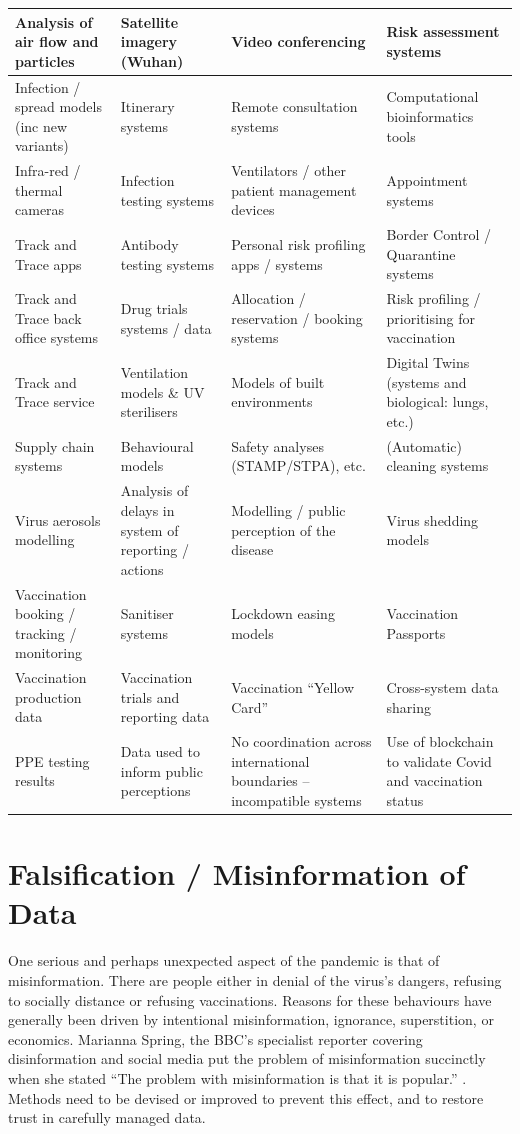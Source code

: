 \begin{longtable}{|L{}|L{}|L{}|L{}|}
  Analysis of air flow and particles & 
  Satellite imagery (Wuhan) &
  Video conferencing &
  Risk assessment systems\\\hline
  Infection / spread models (inc new variants) &
  Itinerary systems &
  Remote consultation systems &
  Computational bioinformatics tools\\\hline
  Infra-red / thermal cameras &
  Infection testing systems &
  Ventilators / other patient management devices &
  Appointment systems\\\hline
  Track and Trace apps &
  Antibody testing systems &
  Personal risk profiling apps / systems &
  Border Control / Quarantine systems\\\hline
  Track and Trace back office systems &
  Drug trials systems / data &
  Allocation / reservation / booking systems &
  Risk profiling / prioritising for vaccination\\\hline
  Track and Trace service &
  Ventilation models \& UV sterilisers &
  Models of built environments &
  Digital Twins (systems and biological: lungs, etc.)\\\hline
  Supply chain systems &
  Behavioural models &
  Safety analyses (STAMP/STPA), etc. &
  (Automatic) cleaning systems\\\hline
  Virus aerosols modelling &
  Analysis of delays in system of reporting / actions &
  Modelling / public perception of the disease &
  Virus shedding models\\\hline
%
  Vaccination booking / tracking / monitoring &
  Sanitiser systems &
  Lockdown easing models &
  Vaccination Passports
  \\\hline
%
  Vaccination production data &
  Vaccination trials and reporting data &
  Vaccination ``Yellow Card'' &
  Cross-system data sharing
  \\\hline
%
  PPE testing results &
  Data used to inform public perceptions &
  No coordination across international boundaries -- incompatible systems &
  Use of blockchain to validate Covid and vaccination status\\
  \hline
\end{longtable}

\section{Falsification / Misinformation of Data}
One serious and perhaps unexpected aspect of the pandemic is that of misinformation. There are people either in denial of the virus’s dangers, refusing to socially distance or refusing vaccinations. Reasons for these behaviours have generally been driven by intentional misinformation, ignorance, superstition, or economics. Marianna Spring, the BBC’s specialist reporter covering disinformation and social media put the problem of misinformation succinctly when she stated “The problem with misinformation is that it is popular.” \cite{citation:oneelection}. Methods need to be devised or improved to prevent this effect, and to restore trust in carefully managed data. 

